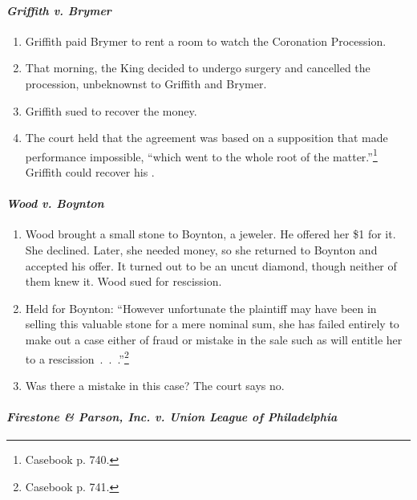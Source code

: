 \paragraph{\emph{Griffith v. Brymer}}

\begin{enumerate}
    \item Griffith paid Brymer  to rent a room to watch the 
    Coronation Procession.
    \item That morning, the King decided to undergo surgery and cancelled the 
    procession, unbeknownst to Griffith and Brymer.
    \item Griffith sued to recover the money.
    \item The court held that the agreement was based on a supposition that 
    made performance impossible, ``which went to the whole root of the 
    matter.''\footnote{Casebook p. 740.} Griffith could recover his 
    .
\end{enumerate}

\paragraph{\emph{Wood v. Boynton}}

\begin{enumerate}
    \item Wood brought a small stone to Boynton, a jeweler. He offered her \$1 
    for it. She declined. Later, she needed money, so she returned to Boynton 
    and accepted his offer. It turned out to be an uncut diamond, though 
    neither of them knew it. Wood sued for rescission.
    \item Held for Boynton: ``However unfortunate the plaintiff may have been 
    in selling this valuable stone for a mere nominal sum, she has failed 
    entirely to make out a case either of fraud or mistake in the sale such as 
    will entitle her to a rescission~.~.~.''\footnote{Casebook p. 741.}
    \item Was there a mistake in this case? The court says no.
\end{enumerate}

\paragraph{\emph{Firestone \& Parson, Inc. v. Union League of Philadelphia}}


